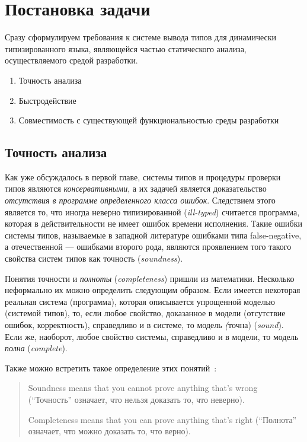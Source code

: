 \chapter{Постановка задачи}

Сразу сформулируем требования к системе вывода типов для динамически
типизированного языка, являющейся частью статического анализа, осуществляемого
средой разработки.

\begin{enumerate}
    \item{Точность анализа}
    \item{Быстродействие}
    \item{Совместимость с существующей функциональностью среды разработки}
\end{enumerate}

\section{Точность анализа}

Как уже обсуждалось в первой главе, системы типов и процедуры проверки типов
являются \emph{консервативными}, а их задачей является доказательство
\emph{отсутствия в программе определенного класса ошибок}.  Следствием этого
является то, что иногда неверно типизированной (\emph{ill-typed}) считается
программа, которая в действительности не имеет ошибок времени исполнения. Такие
ошибки системы типов, называемые в западной литературе ошибками типа
false-negative, а отечественной --- ошибками второго рода, являются проявлением
того такого свойства систем типов как точность (\emph{soundness}). 

Понятия точности и \emph{полноты} (\emph{completeness}) пришли из математики. Несколько
неформально их можно определить следующим образом. Если имеется некоторая
реальная система (программа), которая описывается упрощенной моделью (системой
типов), то, если любое свойство, доказанное в модели (отсутствие ошибок,
корректность), справедливо и в системе, то модель \emph(точна) (\emph{sound}).
Если же, наоборот, любое свойство системы, справедливо и в модели, то модель
\emph{полна} (\emph{complete}).

Также можно встретить такое определение этих понятий~\cite{SoundComplete}:
\begin{quote}
Soundness means that you cannot prove anything that's wrong (``Точность'' означает,
что нельзя доказать то, что неверно).

Completeness means that you can prove anything that's right (``Полнота'' означает,
что можно доказать то, что верно).
\end{quote}

